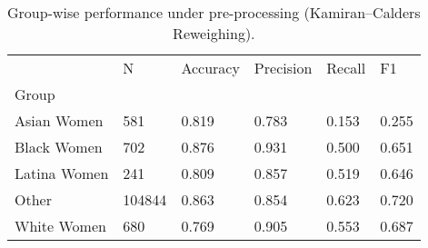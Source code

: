 \begin{table}[htbp]
\centering
\caption{Group-wise performance under pre-processing (Kamiran–Calders Reweighing).}
\label{tab:10-reweigh-group-metrics}
\begin{tabular}{llllll}
\toprule
 & N & Accuracy & Precision & Recall & F1 \\
Group &  &  &  &  &  \\
\midrule
Asian Women & 581 & 0.819 & 0.783 & 0.153 & 0.255 \\
Black Women & 702 & 0.876 & 0.931 & 0.500 & 0.651 \\
Latina Women & 241 & 0.809 & 0.857 & 0.519 & 0.646 \\
Other & 104844 & 0.863 & 0.854 & 0.623 & 0.720 \\
White Women & 680 & 0.769 & 0.905 & 0.553 & 0.687 \\
\bottomrule
\end{tabular}

\end{table}